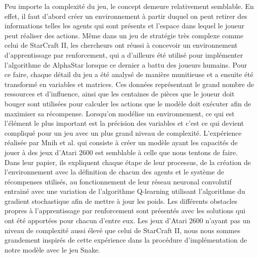 \documentclass{article}
\begin{document}
Peu importe la complexité du jeu, le concept demeure relativement semblable. En effet, il faut d'abord créer un environnement à partir duquel on peut retirer des informations telles les agents qui sont présents et l'espace dans lequel le joueur peut réaliser des actions. Même dans un jeu de stratégie très complexe comme celui de StarCraft II, les chercheurs ont réussi à concevoir un environnement d'apprentissage par renforcement, qui a d'ailleurs été utilisé pour implémenter l'algorithme de AlphaStar lorsque ce dernier a battu des joueurs humains. Pour ce faire, chaque détail du jeu a été analysé de manière munitieuse et a ensuite été transformé en variables et matrices. Ces données représentant le grand nombre de ressources et d'influence, ainsi que les centaines de pièces que le joueur doit bouger sont utilisées pour calculer les actions que le modèle doit exécuter afin de maximiser sa récompense. Lorsqu'on modélise un environnement, ce qui est l'élément le plus important est la précision des variables et c'est ce qui devient compliqué pour un jeu avec un plus grand niveau de complexité.
\linebreak
L'expérience réalisée par Mnih et al.  qui consiste à créer un modèle ayant les capacités de jouer à des jeux d'Atari 2600 est semblable à celle que nous tentons de faire. Dans leur papier, ils expliquent chaque étape de leur processus, de la création de l'environnement avec la définition de chacun des agents et le système de récompenses utilisés, au fonctionnement de leur réseau neuronal convolutif entrainé avec une variation de l'algorithme Q-learning utilisant l'algorithme du gradient stochastique afin de mettre à jour les poids. Les différents obstacles propres à l'apprentissage par renforcement sont présentés avec les solutions qui ont été apportées pour chacun d'entre eux. Les jeux d'Atari 2600 n'ayant pas un niveau de complexité aussi élevé que celui de StarCraft II, nous nous sommes grandement inspirés de cette expérience dans la procédure d'implémentation de notre modèle avec le jeu Snake.
\end{document}
